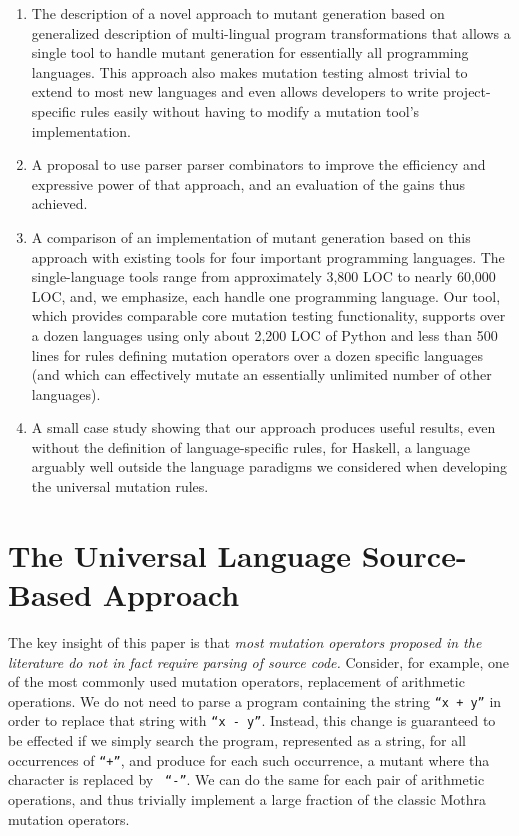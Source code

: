 \documentclass[sigconf,review, anonymous]{acmart}
\begin{document}
\begin{enumerate}
  \item The description of a novel approach to mutant generation
    based on generalized description of multi-lingual program transformations
    that allows a single tool to handle mutant generation for
    essentially all programming languages.  This approach also makes
    mutation testing almost trivial to extend to most new languages and even allows
    developers to write project-specific rules easily without
    having to modify a mutation tool's implementation.

          \item A proposal to use parser parser combinators to improve the
      efficiency and expressive power of that approach, and an
      evaluation of the gains thus achieved.

    
      \item A comparison of an implementation of mutant generation
       based on this approach with existing tools for four important
       programming languages.  The single-language tools range from
       approximately 3,800 LOC to nearly 60,000 LOC, and, we emphasize, each handle
       one programming language.  Our tool, which provides comparable
       core mutation testing functionality, supports over a dozen
       languages using only about 2,200 LOC of Python and less than 500
       lines for rules defining mutation operators over a dozen
       specific languages (and which can effectively mutate an
       essentially unlimited number of other languages).

       \item A small case study showing that our approach produces
         useful results, even without the definition of
         language-specific rules, for Haskell, a language arguably
         well outside the language paradigms we considered when
         developing the universal mutation rules.

\end{enumerate}


\section{The Universal Language Source-Based Approach}

The key insight of this paper is that \emph{most mutation operators
  proposed in the literature do not in fact require parsing of source
  code.}  Consider, for example, one of the most commonly used
mutation operators, replacement of arithmetic operations.  We do not
need to parse a program containing the string {\tt ``x + y''} in order to
replace that string with {\tt ``x - y''}.  Instead, this change is
guaranteed to be effected if we simply search the program, represented
as a string, for all occurrences of  {\tt ``+''}, and produce for each
such occurrence, a mutant where tha character is replaced by {\tt
  ``-''}.  We can do the same for each pair of arithmetic operations,
and thus trivially implement a large fraction of the classic Mothra~\cite{offutt1996experimental}
mutation operators.
\end{document}
